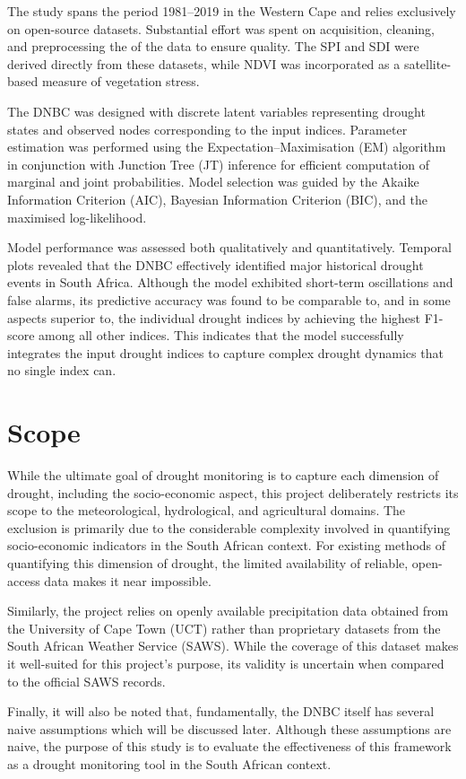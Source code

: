 The study spans the period 1981–2019 in the Western Cape and relies exclusively on open-source datasets. Substantial effort was spent on acquisition, cleaning, and preprocessing the of the data to ensure quality. The SPI and SDI were derived directly from these datasets, while NDVI was incorporated as a satellite-based measure of vegetation stress.

The DNBC was designed with discrete latent variables representing drought states and observed nodes corresponding to the input indices. Parameter estimation was performed using the Expectation–Maximisation (EM) algorithm in conjunction with Junction Tree (JT) inference for efficient computation of marginal and joint probabilities. Model selection was guided by the Akaike Information Criterion (AIC), Bayesian Information Criterion (BIC), and the maximised log-likelihood.

Model performance was assessed both qualitatively and quantitatively. Temporal plots revealed that the DNBC effectively identified major historical drought events in South Africa. Although the model exhibited short-term oscillations and false alarms, its predictive accuracy was found to be comparable to, and in some aspects superior to, the individual drought indices by achieving the highest F1-score among all other indices. This indicates that the model successfully integrates the input drought indices to capture complex drought dynamics that no single index can.

\section{Scope}
While the ultimate goal of drought monitoring is to capture each dimension of drought, including the socio-economic aspect, this project deliberately restricts its scope to the meteorological, hydrological, and agricultural domains. The exclusion is primarily due to the considerable complexity involved in quantifying socio-economic indicators in the South African context. For existing methods of quantifying this dimension of drought, the limited availability of reliable, open-access data makes it near impossible. 

Similarly, the project relies on openly available precipitation data obtained from the University of Cape Town (UCT) rather than proprietary datasets from the South African Weather Service (SAWS). While the coverage of this dataset makes it well-suited for this project's purpose, its validity is uncertain when compared to the official SAWS records.

Finally, it will also be noted that, fundamentally, the DNBC itself has several naive assumptions which will be discussed later. Although these assumptions are naive, the purpose of this study is to evaluate the effectiveness of this framework as a drought monitoring tool in the South African context.

